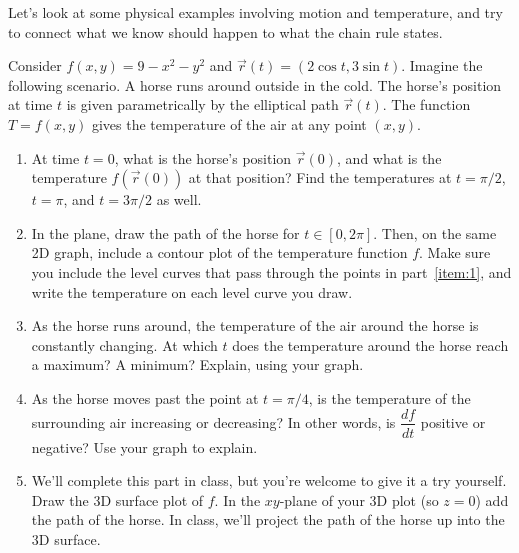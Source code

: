 Let's look at some physical examples involving motion and temperature, and try to connect what we know should happen to what the chain rule states.


\begin{problem}\label{horse track chain rule introduction}
 Consider $f(x,y)=9-x^2-y^2$ and $\vec r(t)=(2\cos t, 3\sin t)$. Imagine the following scenario.  A horse runs around outside in the cold. The horse's position at time $t$ is given parametrically by the elliptical path $\vec r(t)$. The function $T=f(x,y)$ gives the temperature of the air at any point $(x,y)$.  
\begin{enumerate}
 \item\label{item:1} At time $t=0$, what is the horse's position $\vec r(0)$, and what is the temperature $f(\vec r(0))$ at that position? Find the temperatures at $t=\pi/2$, $t=\pi$, and $t=3\pi/2$ as well. 
 \item {}%
In the plane, draw the path of the horse for $t\in [0,2\pi]$. Then, on the same 2D graph, include a contour plot of the temperature function $f$. Make sure you include the level curves that pass through the points in part~\ref{item:1}, and write the temperature on each level curve you draw. 
 \item{}%
 As the horse runs around, the temperature of the air around the horse is constantly changing. 
At which $t$ does the temperature around the horse reach a maximum?  A minimum?  Explain, using your graph. 
 \item\label{item:2} As the horse moves past the point at $t=\pi/4$, is the temperature of the surrounding air increasing or decreasing? In other words, is $\dfrac{df}{dt}$ positive or negative? Use your graph to explain.
 \item We'll complete this part in class, but you're welcome to give it a try yourself. %
Draw the 3D surface plot of $f$. In the $xy$-plane of your 3D plot (so $z=0$) add the path of the horse. In class, we'll project the path of the horse up into the 3D surface. 
\end{enumerate}
\end{problem}


